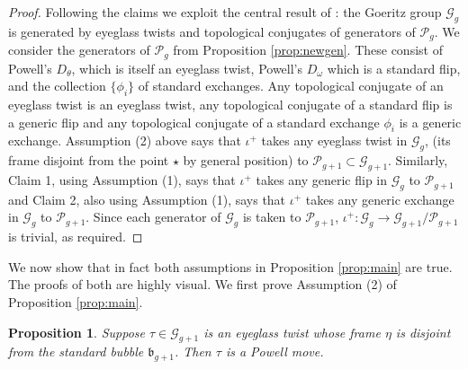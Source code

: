 \documentclass[12pt]{amsart}
\newtheorem{prop}[thm]{Proposition}
\newcommand{\calG}{\mathcal G}
\newcommand{\calP}{\mathcal P}
\newcommand{\frb}{\mathfrak{b}}
\begin{document}
\begin{proof}
Following the claims we exploit the central result of \cite{Sc2}:  the Goeritz group $\calG_g$ is generated by eyeglass twists and topological conjugates of generators of $\calP_g$. We consider the generators of $\calP_g$ from Proposition \ref{prop:newgen}.  These consist of Powell's $D_{\theta}$, which is itself an eyeglass twist, Powell's $D_{\omega}$ which is a standard flip, and the collection $\{\phi_i\}$ of standard exchanges.  Any topological conjugate of an eyeglass twist is an eyeglass twist, any topological conjugate of a standard flip is a generic flip and any topological conjugate of a standard exchange $\phi_i$ is a generic exchange.  Assumption (2) above says that $\iota^+$ takes any eyeglass twist in $\calG_g$, (its frame disjoint from the point $\star$ by general position) to $\calP_{g+1} \subset \calG_{g+1}$.  Similarly, Claim 1, using Assumption (1), says that  $\iota^+$ takes any generic flip in $\calG_g$ to $\calP_{g+1}$ and Claim 2, also using Assumption (1), says that $\iota^+$ takes any generic exchange in $\calG_g$ to $\calP_{g+1}$.  Since each generator of  $\calG_g$ is taken to $\calP_{g+1}$, $\iota^+: \calG_g \to \calG_{g+1}/\calP_{g+1}$ is trivial, as required.
\end{proof}

We now show that in fact both assumptions in Proposition \ref{prop:main} are true.
The proofs of both are highly visual.  We first prove Assumption (2) of Proposition \ref{prop:main}.

\begin{prop}  \label{prop:ass2} Suppose $\tau \in \calG_{g+1}$ is an eyeglass twist whose frame $\eta$ is disjoint from the standard bubble $\frb_{g+1}$.  Then $\tau$ is a Powell move.
\end{prop}
\end{document}
